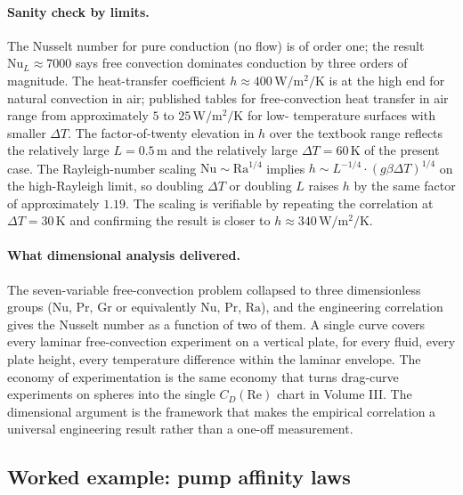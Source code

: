 \paragraph{Sanity check by limits.} The Nusselt number for pure
conduction (no flow) is of order one; the result $\mathrm{Nu}_{L}
\approx 7000$ says free convection dominates conduction by three
orders of magnitude. The heat-transfer coefficient
$h \approx 400 \,\si{\watt\per\meter\squared\per\kelvin}$ is at the
high end for natural convection in air; published tables for
free-convection heat transfer in air range from approximately
$5$ to $25 \,\si{\watt\per\meter\squared\per\kelvin}$ for low-
temperature surfaces with smaller $\Delta T$. The factor-of-twenty
elevation in $h$ over the textbook range reflects the relatively
large $L = 0.5 \,\si{\meter}$ and the relatively large $\Delta T =
60 \,\si{\kelvin}$ of the present case. The Rayleigh-number scaling
$\mathrm{Nu} \sim \mathrm{Ra}^{1/4}$ implies $h \sim L^{-1/4} \cdot
(g \beta \Delta T)^{1/4}$ on the high-Rayleigh limit, so doubling
$\Delta T$ or doubling $L$ raises $h$ by the same factor of
approximately $1.19$. The scaling is verifiable by repeating the
correlation at $\Delta T = 30 \,\si{\kelvin}$ and confirming the
result is closer to $h \approx 340 \,\si{\watt\per\meter\squared
\per\kelvin}$.

\paragraph{What dimensional analysis delivered.} The seven-variable
free-convection problem collapsed to three dimensionless groups
($\mathrm{Nu}$, $\mathrm{Pr}$, $\mathrm{Gr}$ or equivalently
$\mathrm{Nu}$, $\mathrm{Pr}$, $\mathrm{Ra}$), and the engineering
correlation gives the Nusselt number as a function of two of them.
A single curve covers every laminar free-convection experiment on a
vertical plate, for every fluid, every plate height, every
temperature difference within the laminar envelope. The economy of
experimentation is the same economy that turns drag-curve
experiments on spheres into the single $C_{D}(\mathrm{Re})$ chart
in Volume III. The dimensional argument is the framework that makes
the empirical correlation a universal engineering result rather than
a one-off measurement.

\subsection{Worked example: pump affinity laws}

